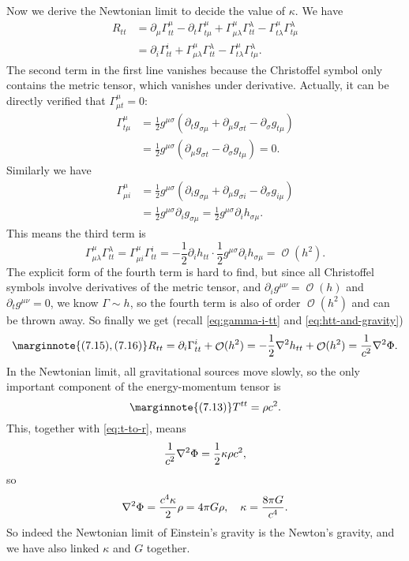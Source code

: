 \documentclass[hyperref, a4paper]{article}
\DeclareMathOperator{\bigO}{\mathcal{O}}
\begin{document}
Now we derive the Newtonian limit to decide the value of $\kappa$. We have 
\[
    \begin{aligned}
        R_{tt} &= \partial_\mu \Gamma^\mu_{tt} - \partial_t \Gamma^\mu_{t \mu} + \Gamma^\mu_{\mu \lambda} \Gamma^\lambda_{tt} - \Gamma^\mu_{t \lambda} \Gamma^\lambda_{t \mu} \\
        &= \partial_i \Gamma^{i}_{tt} + \Gamma^\mu_{\mu \lambda} \Gamma^\lambda_{tt} - \Gamma^\mu_{t \lambda} \Gamma^\lambda_{t \mu}.
    \end{aligned}
\]
The second term in the first line vanishes because the Christoffel symbol only contains the metric tensor, 
which vanishes under derivative. Actually, it can be directly verified that $\Gamma^\mu_{\mu t} = 0$:
\[
    \begin{aligned}
        \Gamma^\mu_{t \mu} &= \frac{1}{2} g^{\mu \sigma} (\partial_t g_{\sigma \mu} + \partial_{\mu} g_{\sigma t} - \partial_\sigma g_{t \mu}) \\
        &= \frac{1}{2} g^{\mu \sigma} (\partial_{\mu} g_{\sigma t} - \partial_\sigma g_{t \mu}) = 0.
    \end{aligned}
\]
Similarly we have
\[
    \begin{aligned}
        \Gamma^\mu_{\mu i} &= \frac{1}{2} g^{\mu \sigma} (\partial_i g_{\sigma \mu} + \partial_\mu g_{\sigma i} - \partial_\sigma g_{i \mu}) \\
        &= \frac{1}{2} g^{\mu \sigma} \partial_i g_{\sigma \mu} = \frac{1}{2} g^{\mu \sigma} \partial_i h_{\sigma \mu}.
    \end{aligned}
\]
This means the third term is 
\[
    \Gamma^\mu_{\mu \lambda} \Gamma^\lambda_{tt} = \Gamma^\mu_{\mu i} \Gamma^i_{tt} = - \frac{1}{2} \partial_i h_{tt} \cdot \frac{1}{2} g^{\mu \sigma} \partial_i h_{\sigma \mu} = \bigO(h^2).
\]
The explicit form of the fourth term is hard to find, but since all Christoffel symbols involve derivatives
of the metric tensor, and $\partial_i g^{\mu \nu} = \bigO(h)$ and $\partial_t g^{\mu \nu} = 0$,
we know $\Gamma \sim h$, so the fourth term is also of order $\bigO(h^2)$ and can be thrown away. 
So finally we get (recall \eqref{eq:gamma-i-tt} and \eqref{eq:htt-and-gravity}) 
\begin{equation} \marginnote{(7.15), (7.16)}
    R_{tt} = \partial_i \Gamma^i_{tt} + \bigO(h^2) = - \frac{1}{2} \laplacian h_{tt} + \bigO(h^2) = \frac{1}{c^2} \laplacian \Phi.
\end{equation}
In the Newtonian limit, all gravitational sources move slowly, so the only important component of 
the energy-momentum tensor is 
\begin{equation} \marginnote{(7.13)}
    T^{tt} = \rho c^2.
\end{equation}
This, together with \eqref{eq:t-to-r}, means 
\[
    \frac{1}{c^2} \laplacian \Phi = \frac{1}{2} \kappa \rho c^2,
\]
so 
\begin{equation}
    \laplacian \Phi = \frac{c^4 \kappa}{2} \rho = 4 \pi G \rho, \quad \kappa = \frac{8 \pi G}{c^4}.
\end{equation}
So indeed the Newtonian limit of Einstein's gravity is the Newton's gravity, and we have also linked 
$\kappa$ and $G$ together.



\end{document}
